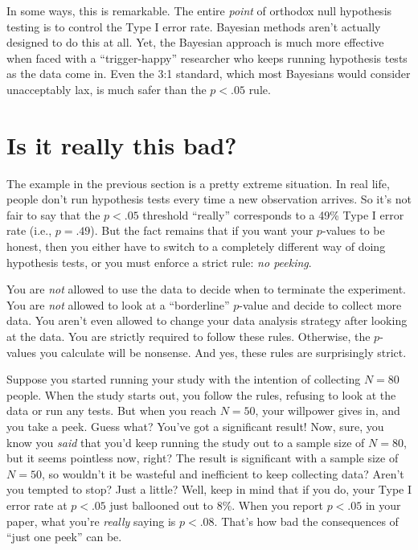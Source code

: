 \documentclass[
]{book}
\theoremstyle{definition}
\theoremstyle{definition}
\theoremstyle{definition}
\theoremstyle{definition}
\theoremstyle{remark}
\begin{document}
In some ways, this is remarkable. The entire \emph{point} of orthodox null hypothesis testing is to control the Type I error rate. Bayesian methods aren't actually designed to do this at all. Yet, the Bayesian approach is much more effective when faced with a ``trigger-happy'' researcher who keeps running hypothesis tests as the data come in. Even the 3:1 standard, which most Bayesians would consider unacceptably lax, is much safer than the \(p<.05\) rule.

\hypertarget{is-it-really-this-bad}{%
\section{Is it really this bad?}\label{is-it-really-this-bad}}

The example in the previous section is a pretty extreme situation. In real life, people don't run hypothesis tests every time a new observation arrives. So it's not fair to say that the \(p<.05\) threshold ``really'' corresponds to a 49\% Type I error rate (i.e., \(p=.49\)). But the fact remains that if you want your \(p\)-values to be honest, then you either have to switch to a completely different way of doing hypothesis tests, or you must enforce a strict rule: \emph{no peeking}.

You are \emph{not} allowed to use the data to decide when to terminate the experiment. You are \emph{not} allowed to look at a ``borderline'' \(p\)-value and decide to collect more data. You aren't even allowed to change your data analysis strategy after looking at the data. You are strictly required to follow these rules. Otherwise, the \(p\)-values you calculate will be nonsense. And yes, these rules are surprisingly strict.

Suppose you started running your study with the intention of collecting \(N=80\) people. When the study starts out, you follow the rules, refusing to look at the data or run any tests. But when you reach \(N=50\), your willpower gives in, and you take a peek. Guess what? You've got a significant result! Now, sure, you know you \emph{said} that you'd keep running the study out to a sample size of \(N=80\), but it seems pointless now, right? The result is significant with a sample size of \(N=50\), so wouldn't it be wasteful and inefficient to keep collecting data? Aren't you tempted to stop? Just a little? Well, keep in mind that if you do, your Type I error rate at \(p<.05\) just ballooned out to 8\%. When you report \(p<.05\) in your paper, what you're \emph{really} saying is \(p<.08\). That's how bad the consequences of ``just one peek'' can be.
\end{document}
